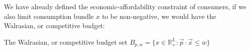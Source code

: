 We have already defined the economic-affordability constraint of consumers, if we also limit consumption bundle $x$ to be non-negative, we would have the Walrasian, or competitive budget:

\begin{definition}
    The Walrasian, or competitive budget set $B_{p,w}=\{x\in\mathbb{R}^L_+:\vec{p}\cdot\vec{x}\leq w\}$
\end{definition}